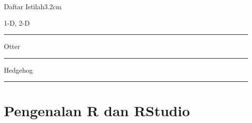 \documentclass[a4paper, nobind]{templates/ociamthesis}
\begin{document}
\begin{romanpages}
\dominitoc %

\flushbottom

\tableofcontents

\listoffigures
	\mtcaddchapter

\listoftables
  \mtcaddchapter
\begin{mclistof}{Daftar Istilah}{3.2cm}

\item[1-D, 2-D]

\begin{center}\rule{0.5\linewidth}{0.5pt}\end{center}

\item[Otter]

\begin{center}\rule{0.5\linewidth}{0.5pt}\end{center}

\item[Hedgehog]

\begin{center}\rule{0.5\linewidth}{0.5pt}\end{center}

\end{mclistof} 


\end{romanpages}

\flushbottom

\hypertarget{pengenalan-r-dan-rstudio}{%
\chapter{Pengenalan R dan RStudio}\label{pengenalan-r-dan-rstudio}}
\end{document}
